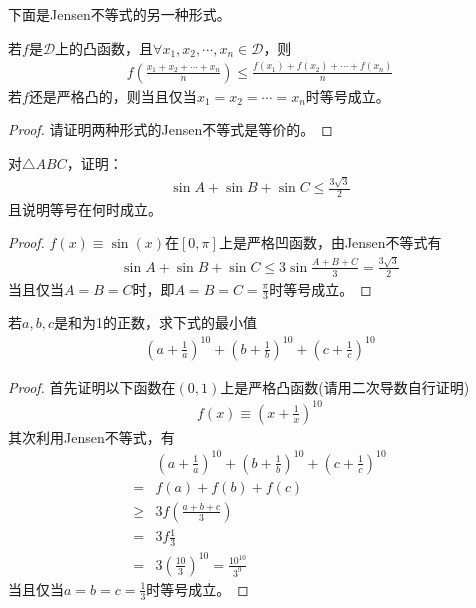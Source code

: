 下面是Jensen不等式的另一种形式。
\begin{theorem}[Jensen不等式]
  若$f$是$\mathcal{D}$上的凸函数，且$\forall x_1,x_2,\cdots,x_n\in\mathcal{D}$，则
  \begin{align}
    f\left(\frac{x_1+x_2+\cdots+x_n}{n}\right)\le\frac{f(x_1)+f(x_2)+\cdots+f(x_n)}{n}
  \end{align}
  若$f$还是严格凸的，则当且仅当$x_1=x_2=\cdots=x_n$时等号成立。
\end{theorem}

\begin{proof}
  {\color{red}请证明两种形式的Jensen不等式是等价的。}
\end{proof}

\begin{example}
  对$\triangle ABC$，证明：
  \begin{align*}
    \sin A + \sin B + \sin C \le \frac{3\sqrt3}{2}
  \end{align*}
  且说明等号在何时成立。
\end{example}

\begin{proof}
  $f(x)\equiv\sin(x)$在$[0,\pi]$上是严格凹函数，由Jensen不等式有
  \begin{align*}
    \sin A + \sin B + \sin C \le 3\sin\frac{A+B+C}{3} = \frac{3\sqrt3}{2}
  \end{align*}
  当且仅当$A=B=C$时，即$A=B=C=\frac\pi3$时等号成立。
\end{proof}

\begin{example}
  若$a,b,c$是和为1的正数，求下式的最小值
  \begin{align*}
    \left(a+\frac1a\right)^{10} + 
    \left(b+\frac1b\right)^{10} + 
    \left(c+\frac1c\right)^{10}
  \end{align*}
\end{example}

\begin{proof}
  首先证明以下函数在$(0,1)$上是严格凸函数({\color{red}请用二次导数自行证明})
  \begin{align*}
    f(x)\equiv\left(x+\frac1x\right)^{10}
  \end{align*}
  其次利用Jensen不等式，有
  \begin{align*}
    &\left(a+\frac1a\right)^{10} + 
    \left(b+\frac1b\right)^{10} + 
    \left(c+\frac1c\right)^{10}\\
    =&   f(a) + f(b) + f(c)\\
    \ge& 3f\left(\frac{a+b+c}3\right)\\
    =&   3f{\frac13}\\
    =&   3 \left(\frac{10}{3}\right)^{10} = \frac{10^{10}}{3^9}
  \end{align*}
  当且仅当$a=b=c=\frac13$时等号成立。
\end{proof}